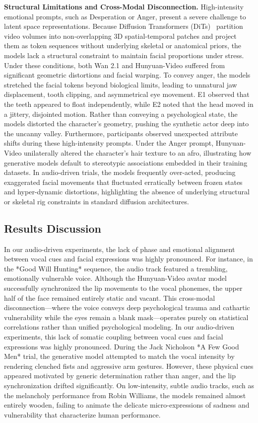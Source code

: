 \documentclass[pdflatex,sn-mathphys-num]{sn-jnl}
\newcommand{\emAnger}{Anger\xspace}
\newcommand{\Eone}{\colorbox{gray!15}{E1}\xspace}
\newcommand{\Etwo}{\colorbox{gray!30}{E2}\xspace}
\theoremstyle{thmstyleone}
\theoremstyle{thmstyletwo}
\theoremstyle{thmstylethree}
\begin{document}
\textbf{Structural Limitations and Cross-Modal Disconnection.} High-intensity emotional prompts, such as Desperation or \emAnger, present a severe challenge to latent space representations. Because Diffusion Transformers (DiTs)~\cite{peebles2023scalable} partition video volumes into non-overlapping 3D spatial-temporal patches and project them as token sequences without underlying skeletal or anatomical priors, the models lack a structural constraint to maintain facial proportions under stress. Under these conditions, both Wan 2.1 and Hunyuan-Video suffered from significant geometric distortions and facial warping. To convey anger, the models stretched the facial tokens beyond biological limits, leading to unnatural jaw displacement, tooth clipping, and asymmetrical eye movement. \Eone observed that the teeth appeared to float independently, while \Etwo noted that the head moved in a jittery, disjointed motion. Rather than conveying a psychological state, the models distorted the character's geometry, pushing the synthetic actor deep into the uncanny valley. Furthermore, participants observed unexpected attribute shifts during these high-intensity prompts. Under the \emAnger prompt, Hunyuan-Video unilaterally altered the character's hair texture to an afro, illustrating how generative models default to stereotypic associations embedded in their training datasets. In audio-driven trials, the models frequently over-acted, producing exaggerated facial movements that fluctuated erratically between frozen states and hyper-dynamic distortions, highlighting the absence of underlying structural or skeletal rig constraints in standard diffusion architectures.


\subsection{Results Discussion}\label{sec5:technical}

In our audio-driven experiments, the lack of phase and emotional alignment between vocal cues and facial expressions was highly pronounced. For instance, in the *Good Will Hunting* sequence, the audio track featured a trembling, emotionally vulnerable voice. Although the Hunyuan-Video avatar model successfully synchronized the lip movements to the vocal phonemes, the upper half of the face remained entirely static and vacant. This cross-modal disconnection—where the voice conveys deep psychological trauma and cathartic vulnerability while the eyes remain a blank mask—operates purely on statistical correlations rather than unified psychological modeling. In our audio-driven experiments, this lack of somatic coupling between vocal cues and facial expressions was highly pronounced. During the Jack Nicholson *A Few Good Men* trial, the generative model attempted to match the vocal intensity by rendering clenched fists and aggressive arm gestures. However, these physical cues appeared motivated by generic determination rather than anger, and the lip synchronization drifted significantly. On low-intensity, subtle audio tracks, such as the melancholy performance from Robin Williams, the models remained almost entirely wooden, failing to animate the delicate micro-expressions of sadness and vulnerability that characterize human performance.
\end{document}
